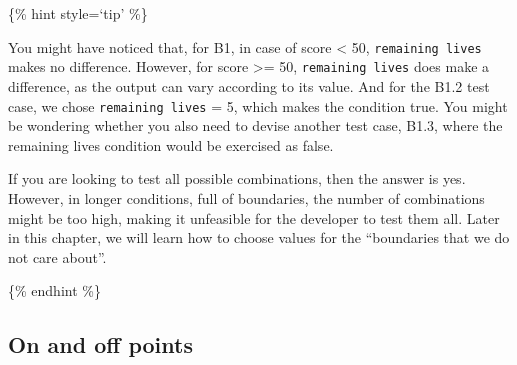 \begin{Shaded}
\begin{Highlighting}[]
 \NormalTok{() \{}
  \NormalTok{(}\NormalTok{+}\NormalTok{(}\NormalTok{, }\NormalTok{));}
  \NormalTok{(}\NormalTok{*}\NormalTok{(}\NormalTok{, }\NormalTok{));}
\NormalTok{\}}

 \NormalTok{() \{}
  \NormalTok{(}\NormalTok{*}\NormalTok{(}\NormalTok{, }\NormalTok{));}
  \NormalTok{(}\NormalTok{+}\NormalTok{(}\NormalTok{, }\NormalTok{));}
\NormalTok{\}}
\end{Highlighting}
\end{Shaded}

\{\% hint style=`tip' \%\}

You might have noticed that, for B1, in case of score \textless{} 50,
\texttt{remaining\ lives} makes no difference. However, for score
\textgreater= 50, \texttt{remaining\ lives} does make a difference, as
the output can vary according to its value. And for the B1.2 test case,
we chose \texttt{remaining\ lives} = 5, which makes the condition true.
You might be wondering whether you also need to devise another test
case, B1.3, where the remaining lives condition would be exercised as
false.

If you are looking to test all possible combinations, then the answer is
yes. However, in longer conditions, full of boundaries, the number of
combinations might be too high, making it unfeasible for the developer
to test them all. Later in this chapter, we will learn how to choose
values for the ``boundaries that we do not care about''.

\{\% endhint \%\}

\hypertarget{on-and-off-points}{%
\subsection{On and off points}\label{on-and-off-points}}

